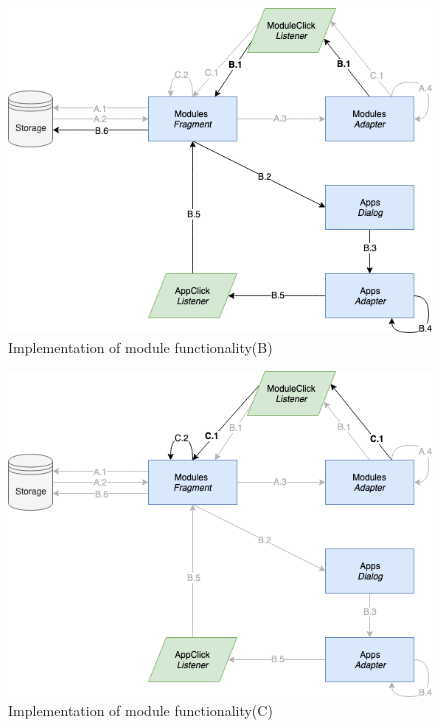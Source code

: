 \begin{figure}
    \centering
    \includegraphics[scale=0.6]{images/Module_ImpB.png}
    \caption{Implementation of module functionality(B)}
    \label{fig:impl_modulesB}
\end{figure}

\begin{figure}
    \centering
    \includegraphics[scale=0.6]{images/Module_ImpC.png}
    \caption{Implementation of module functionality(C)}
    \label{fig:impl_modulesC}
\end{figure}

